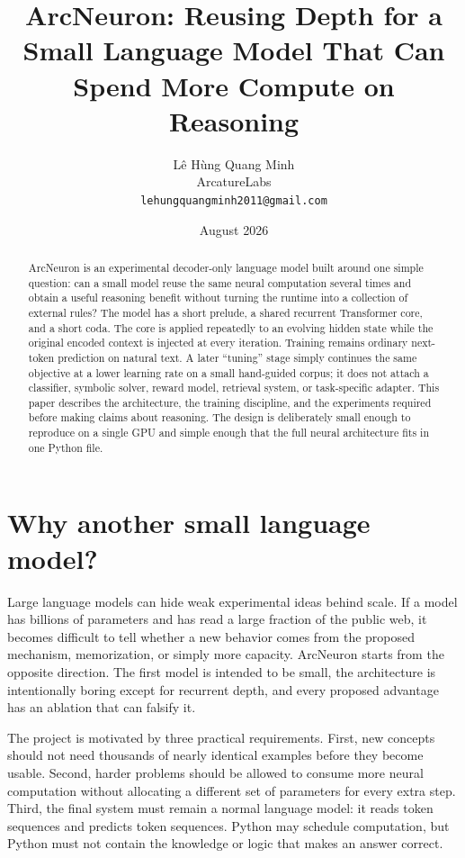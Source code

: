 \documentclass[10pt]{article}
\title{ArcNeuron: Reusing Depth for a Small Language Model That Can Spend More Compute on Reasoning}
\author{Lê Hùng Quang Minh\\ArcatureLabs\\\texttt{lehungquangminh2011@gmail.com}}
\date{August 2026}
\begin{document}
\maketitle

\begin{abstract}
ArcNeuron is an experimental decoder-only language model built around one simple question: can a small model reuse the same neural computation several times and obtain a useful reasoning benefit without turning the runtime into a collection of external rules? The model has a short prelude, a shared recurrent Transformer core, and a short coda. The core is applied repeatedly to an evolving hidden state while the original encoded context is injected at every iteration. Training remains ordinary next-token prediction on natural text. A later ``tuning'' stage simply continues the same objective at a lower learning rate on a small hand-guided corpus; it does not attach a classifier, symbolic solver, reward model, retrieval system, or task-specific adapter. This paper describes the architecture, the training discipline, and the experiments required before making claims about reasoning. The design is deliberately small enough to reproduce on a single GPU and simple enough that the full neural architecture fits in one Python file.
\end{abstract}

\section{Why another small language model?}

Large language models can hide weak experimental ideas behind scale. If a model has billions of parameters and has read a large fraction of the public web, it becomes difficult to tell whether a new behavior comes from the proposed mechanism, memorization, or simply more capacity. ArcNeuron starts from the opposite direction. The first model is intended to be small, the architecture is intentionally boring except for recurrent depth, and every proposed advantage has an ablation that can falsify it.

The project is motivated by three practical requirements. First, new concepts should not need thousands of nearly identical examples before they become usable. Second, harder problems should be allowed to consume more neural computation without allocating a different set of parameters for every extra step. Third, the final system must remain a normal language model: it reads token sequences and predicts token sequences. Python may schedule computation, but Python must not contain the knowledge or logic that makes an answer correct.
\end{document}
